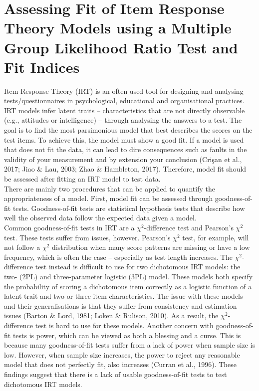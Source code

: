 \documentclass[Royal,sageapa,times,doublespace]{sagej}
\begin{document}
\section{
\centering
Assessing Fit of Item Response Theory Models using a Multiple Group Likelihood Ratio Test and Fit Indices
}
Item Response Theory (IRT) is an often used tool for designing and analysing tests/questionnaires in psychological, educational and organisational practices. IRT models infer latent traits -- characteristics that are not directly observable (e.g., attitudes or intelligence) -- through analysing the answers to a test. The goal is to find the most parsimonious model that best describes the scores on the test items. To achieve this, the model must show a good fit. If a model is used that does not fit the data, it can lead to dire consequences such as faults in the validity of your measurement and by extension your conclusion (Cri\c{s}an et al., 2017; Jiao \& Lau, 2003; Zhao \& Hambleton, 2017). Therefore, model fit should be assessed after fitting an IRT model to test data. \\
\indent There are mainly two procedures that can be applied to quantify the appropriateness of a model. First, model fit can be assessed through goodness-of-fit tests. Goodness-of-fit tests are statistical hypothesis tests that describe how well the observed data follow the expected data given a model. \\
\indent Common goodness-of-fit tests in IRT are a $\chi^2$-difference test and Pearson's $\chi^2$ test. These tests suffer from issues, however. Pearson's $\chi^2$ test, for example, will not follow a $\chi^2$ distribution when many score patterns are missing or have a low frequency, which is often the case -- especially as test length increases. The $\chi^2$-difference test instead is difficult to use for two dichotomous IRT models: the two- (2PL) and three-parameter logistic (3PL) model. These models both specify the probability of scoring a dichotomous item correctly as a logistic function of a latent trait and two or three item characteristics. The issue with these models and their generalisations is that they suffer from consistency and estimation issues (Barton \& Lord, 1981; Loken \& Rulison, 2010). As a result, the $\chi^2$-difference test is hard to use for these models. Another concern with goodness-of-fit tests is power, which can be viewed as both a blessing and a curse. This is because many goodness-of-fit tests suffer from a lack of power when sample size is low. However, when sample size increases, the power to reject any reasonable model that does not perfectly fit, also increases (Curran et al., 1996). These findings suggest that there is a lack of usable goodness-of-fit tests to test dichotomous IRT models. \\
\end{document}

